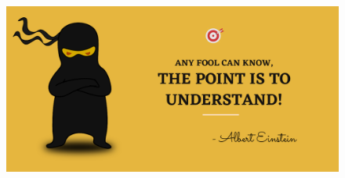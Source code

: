 \setlength{\columnsep}{3pt}
\begin{flushleft}
	\paragraph{}

	\bigskip

	\begin{figure}[h!]
		\centering
		\includegraphics[scale=.2]{content/practise.jpg}
	\end{figure}	
	

\end{flushleft}
